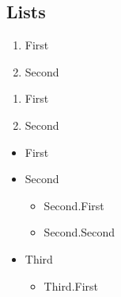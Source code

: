 \documentclass[../main.tex]{subfiles}
\begin{document}
\subsection{Lists}

\begin{enumerate}[label=\roman*]
    \item First
    \item Second
\end{enumerate}

\begin{enumerate}[label=\alph*.]
    \item First
    \item Second
\end{enumerate}

\begin{itemize}
    \item[] First
    \item[] Second
        \begin{itemize}
            \item[] Second.First 
            \item[] Second.Second
        \end{itemize}
    \item[] Third
        \begin{itemize}
            \item[] Third.First
        \end{itemize}
\end{itemize}
\end{document}
